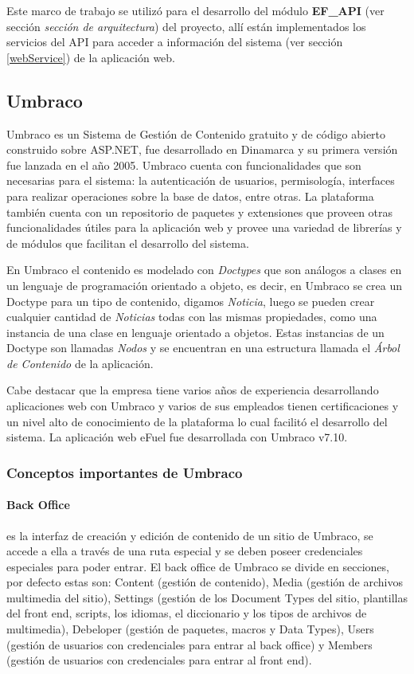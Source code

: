     Este marco de trabajo se utilizó para el desarrollo del módulo \textbf{EF\_API} (ver sección \emph{sección de arquitectura}) del proyecto, allí están implementados los servicios del API para acceder a información del sistema (ver sección \ref{webService}) de la aplicación web.

    \subsection{Umbraco}
    Umbraco es un Sistema de Gestión de Contenido gratuito y de código abierto construido sobre ASP.NET, fue desarrollado en Dinamarca y su primera versión fue lanzada en el año 2005. Umbraco cuenta con funcionalidades que son necesarias para el sistema: la autenticación de usuarios, permisología, interfaces para realizar operaciones sobre la base de datos, entre otras. La plataforma también cuenta con un repositorio de paquetes y extensiones que proveen otras funcionalidades útiles para la aplicación web y provee una variedad de librerías y de módulos que facilitan el desarrollo del sistema.

    En Umbraco el contenido es modelado con \emph{Doctypes} que son análogos a clases en un lenguaje de programación orientado a objeto, es decir, en Umbraco se crea un Doctype para un tipo de contenido, digamos \emph{Noticia}, luego se pueden crear cualquier cantidad de \emph{Noticias} todas con las mismas propiedades, como una instancia de una clase en lenguaje orientado a objetos. Estas instancias de un Doctype son llamadas \emph{Nodos} y se encuentran en una estructura llamada el \emph{Árbol de Contenido} de la aplicación.

    Cabe destacar que la empresa tiene varios años de experiencia desarrollando aplicaciones web con Umbraco y varios de sus empleados tienen certificaciones y un nivel alto de conocimiento de la plataforma lo cual facilitó el desarrollo del sistema. La aplicación web eFuel fue desarrollada con Umbraco v7.10.

    \subsubsection{Conceptos importantes de Umbraco}
    \paragraph{Back Office} es la interfaz de creación y edición de contenido de un sitio de Umbraco, se accede a ella a través de una ruta especial y se deben poseer credenciales especiales para poder entrar. El back office de Umbraco se divide en secciones, por defecto estas son: Content (gestión de contenido), Media (gestión de archivos multimedia del sitio), Settings (gestión de los Document Types del sitio, plantillas del front end, scripts, los idiomas, el diccionario y los tipos de archivos de multimedia), Debeloper (gestión de paquetes, macros y Data Types), Users (gestión de usuarios con credenciales para entrar al back office) y Members (gestión de usuarios con credenciales para entrar al front end).
